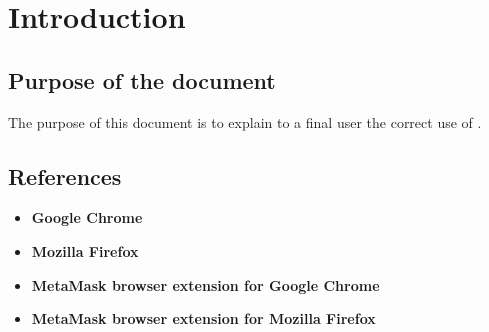 \documentclass[ManualeUtente.tex]{subfiles}
\begin{document}
\chapter{Introduction}

	\section{Purpose of the document}
	The purpose of this document is to explain to a final user the correct use of \progetto.
	
	\scopoProdottoEN
	
	\section{References}
		\begin{itemize}
			\item \textbf{Google Chrome}\\
			\item \textbf{Mozilla Firefox}\\
			\item \textbf{MetaMask browser extension for Google Chrome}\\
			\item \textbf{MetaMask browser extension for Mozilla Firefox}\\
		\end{itemize}
\end{document}
